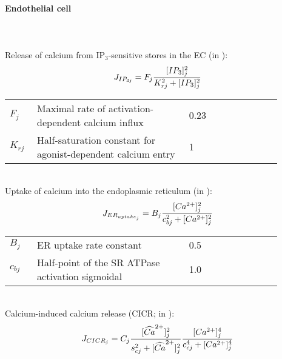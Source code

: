 \documentclass[fleqn]{report}
\numberwithin{equation}{section}
\numberwithin{equation}{section}
\begin{document}
							\paragraph{Endothelial cell}~\\
							\\
							Release of calcium from IP$_{3}$-sensitive stores in the EC (in \uMps):
							\begin{equation} \label{eq:JIP3j}
							J_{IP_{3j}} = F_{j}\frac{[IP_{3}]_{j}^{2}}{K_{rj}^{2}+[IP_{3}]_{j}^{2}}
							\end{equation}
							\begin{table}[h!]
							\centering
							\begin{tabular}{ p{0.09\linewidth}  >{\footnotesize} p{0.5\linewidth}  >{\footnotesize} p{0.27\linewidth} >{\footnotesize} p{0.03\linewidth} }
							\hline
							 $F_{j}$      			& Maximal rate of activation-dependent calcium influx			& 0.23 \uMps				& \cite{Koenigsberger2006} \\
							$K_{rj}$				& Half-saturation constant for agonist-dependent calcium entry	& 1 \uM					& \cite{Koenigsberger2006} \\
							\hline
							\end{tabular}
							\label{tab:IP3j}
							\end{table}
							\\
							Uptake of calcium into the endoplasmic reticulum (in \uMs):
							\begin{equation} \label{eq:JERuptakej}
							J_{ER_{uptake_{j}}} = B_{j}\frac{[Ca^{2+}]_{j}^{2}}{c_{bj}^{2}+[Ca^{2+}]_{j}^{2}}
							\end{equation}
							\begin{table}[h!]
							\centering
							\begin{tabular}{ p{0.09\linewidth}  >{\footnotesize} p{0.5\linewidth}  >{\footnotesize} p{0.27\linewidth} >{\footnotesize} p{0.03\linewidth} }
							\hline
							$B_{j}$      			& ER uptake rate constant							& 0.5 \uMs				& \cite{Koenigsberger2006} \\
							$c_{bj}$				& Half-point of the SR ATPase activation sigmoidal 	& 1.0 \uM					& \cite{Koenigsberger2006} \\
							\hline
							\end{tabular}
							\label{tab:JERuptakej}
							\end{table}
							\\
							Calcium-induced calcium release (CICR; in \uMs):
							\begin{equation} \label{eq:JCICRJ}
							J_{CICR_{j}} = C_{j}\frac{[\widehat{Ca}^{2+}]_{j}^{2}}{s_{cj}^{2}+[\widehat{Ca}^{2+}]_{j}^{2}}    \frac{[Ca^{2+}]_{j}^{4}}{c_{cj}^{4}+[Ca^{2+}]_{j}^{4}}
							\end{equation}
\end{document}
